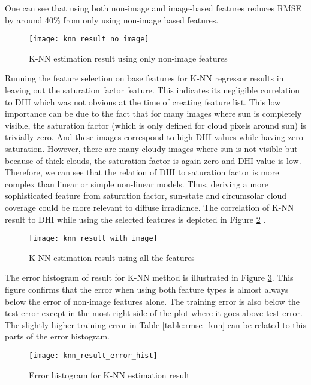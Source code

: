 One can see that using both non-image and image-based features reduces RMSE by around 40\% from only using non-image based features.

\begin{figure}[h!]
\caption{K-NN estimation result using only non-image features}
\label{fig:knn_result_no_image}
\texttt{[image: knn\_result\_no\_image]}
\centering
\end{figure}

Running the feature selection on base features for K-NN regressor results in leaving out the saturation factor feature. This indicates its negligible correlation to DHI which was not obvious at the time of creating feature list. This low importance can be due to the fact that for many images where sun is completely visible, the saturation factor (which is only defined for cloud pixels around sun) is trivially zero. And these images correspond to high DHI values while having zero saturation. However, there are many cloudy images where sun is not visible but because of thick clouds, the saturation factor is again zero and DHI value is low. Therefore, we can see that the relation of DHI to saturation factor is more complex than linear or simple non-linear models. Thus, deriving a more sophisticated feature from saturation factor, sun-state and circumsolar cloud coverage could be more relevant to diffuse irradiance. The correlation of K-NN result to DHI while using the selected features is depicted in Figure \ref{fig:knn_result_all} .

\begin{figure}[h!]
\caption{K-NN estimation result using all the features}
\label{fig:knn_result_all}
\texttt{[image: knn\_result\_with\_image]}
\centering
\end{figure}

The error histogram of result for K-NN method is illustrated in Figure \ref{fig:err_hist_knn}. This figure confirms that the error when using both feature types is almost always below the error of non-image features alone. The training error is also below the test error except in the most right side of the plot where it goes above test error. The slightly higher training error in Table \ref{table:rmse_knn} can be related to this parts of the error histogram.

\begin{figure}[h!]
\caption{Error histogram for K-NN estimation result}
\label{fig:err_hist_knn}
\texttt{[image: knn\_result\_error\_hist]}
\centering
\end{figure}

